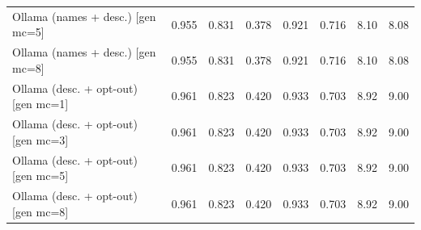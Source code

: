 \begin{tabular}{lccccccc}
Ollama (names + desc.) [gen mc=5] & 0.955 & 0.831 & 0.378 & 0.921 & 0.716 & 8.10 & 8.08 \\
Ollama (names + desc.) [gen mc=8] & 0.955 & 0.831 & 0.378 & 0.921 & 0.716 & 8.10 & 8.08 \\
Ollama (desc. + opt-out) [gen mc=1] & 0.961 & 0.823 & 0.420 & 0.933 & 0.703 & 8.92 & 9.00 \\
Ollama (desc. + opt-out) [gen mc=3] & 0.961 & 0.823 & 0.420 & 0.933 & 0.703 & 8.92 & 9.00 \\
Ollama (desc. + opt-out) [gen mc=5] & 0.961 & 0.823 & 0.420 & 0.933 & 0.703 & 8.92 & 9.00 \\
Ollama (desc. + opt-out) [gen mc=8] & 0.961 & 0.823 & 0.420 & 0.933 & 0.703 & 8.92 & 9.00 \\
\bottomrule
\end{tabular}
